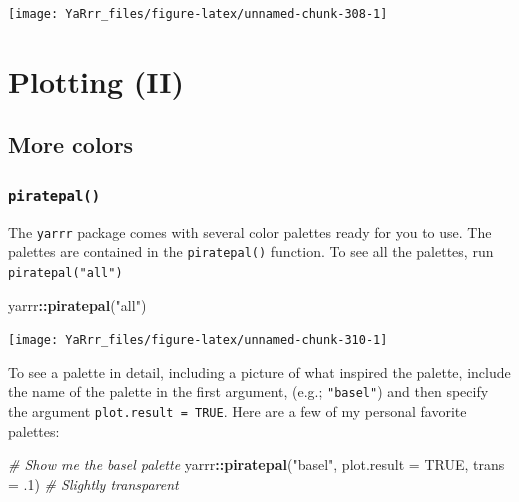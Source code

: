 \documentclass[]{book}
\newenvironment{Shaded}{\begin{snugshade}}{\end{snugshade}}
\newcommand{\KeywordTok}[1]{\textcolor[rgb]{0.13,0.29,0.53}{\textbf{#1}}}
\newcommand{\DataTypeTok}[1]{\textcolor[rgb]{0.13,0.29,0.53}{#1}}
\newcommand{\DecValTok}[1]{\textcolor[rgb]{0.00,0.00,0.81}{#1}}
\newcommand{\StringTok}[1]{\textcolor[rgb]{0.31,0.60,0.02}{#1}}
\newcommand{\CommentTok}[1]{\textcolor[rgb]{0.56,0.35,0.01}{\textit{#1}}}
\newcommand{\OtherTok}[1]{\textcolor[rgb]{0.56,0.35,0.01}{#1}}
\newcommand{\OperatorTok}[1]{\textcolor[rgb]{0.81,0.36,0.00}{\textbf{#1}}}
\newcommand{\NormalTok}[1]{#1}
\theoremstyle{definition}
\theoremstyle{definition}
\theoremstyle{remark}
\begin{document}
\begin{center}\texttt{[image: YaRrr\_files/figure-latex/unnamed-chunk-308-1]} \end{center}

\chapter{Plotting (II)}\label{plotting2}

\section{More colors}\label{more-colors}

\subsection{\texorpdfstring{\texttt{piratepal()}}{piratepal()}}\label{piratepal}

The \texttt{yarrr} package comes with several color palettes ready for
you to use. The palettes are contained in the \texttt{piratepal()}
function. To see all the palettes, run \texttt{piratepal("all")}

\begin{Shaded}
\begin{Highlighting}[]
\NormalTok{yarrr}\OperatorTok{::}\KeywordTok{piratepal}\NormalTok{(}\StringTok{"all"}\NormalTok{)}
\end{Highlighting}
\end{Shaded}

\begin{center}\texttt{[image: YaRrr\_files/figure-latex/unnamed-chunk-310-1]} \end{center}

To see a palette in detail, including a picture of what inspired the
palette, include the name of the palette in the first argument, (e.g.;
\texttt{"basel"}) and then specify the argument
\texttt{plot.result\ =\ TRUE}. Here are a few of my personal favorite
palettes:

\begin{Shaded}
\begin{Highlighting}[]
\CommentTok{# Show me the basel palette}
\NormalTok{yarrr}\OperatorTok{::}\KeywordTok{piratepal}\NormalTok{(}\StringTok{"basel"}\NormalTok{,            }
                 \DataTypeTok{plot.result =} \OtherTok{TRUE}\NormalTok{,}
                 \DataTypeTok{trans =}\NormalTok{ .}\DecValTok{1}\NormalTok{)          }\CommentTok{# Slightly transparent}
\end{Highlighting}
\end{Shaded}
\end{document}
